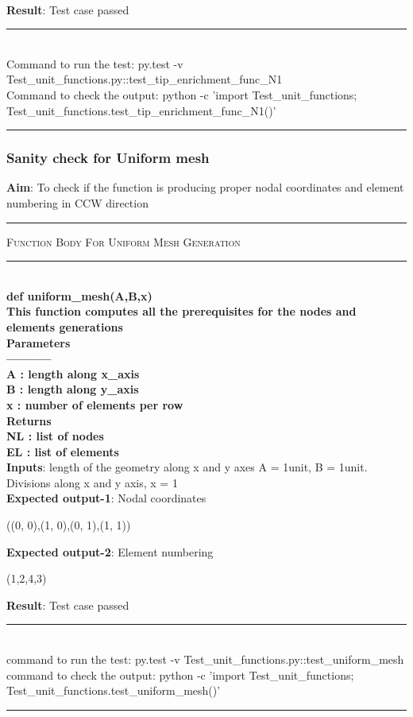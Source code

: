 \documentclass[fleqn, 12.5pt,a4paper]{report}
\begin{document}
\\
\textbf{Result}: Test case passed\\
\newline
{\rule{\linewidth}{0.02cm}}\\
Command to run the test: {\selectfont py.test -v Test{\_}unit{\_}functions.py::test{\_}tip{\_}enrichment{\_}func{\_}N1}\\
Command to check the output: {\selectfont python -c 'import Test{\_}unit{\_}functions;\\
Test{\_}unit{\_}functions.test{\_}tip{\_}enrichment{\_}func{\_}N1()'}\\
{\rule{\linewidth}{0.02cm}}

\subsubsection{Sanity check for Uniform mesh}
\textbf{Aim}: To check if the function is producing proper nodal coordinates and element numbering in CCW direction\newline
{ \rule{\linewidth}{0.05cm}}
	{\scshape Function Body For Uniform Mesh Generation}\\
{ \rule{\linewidth}{0.05cm}}
{\selectfont
\\
\textbf{def uniform{\_}mesh(A,B,x)\\
    This function computes all the prerequisites for the nodes and elements generations\\
    Parameters\\
    -----------\\
    A : length along x{\_}axis\\
    B : length along y{\_}axis\\
    x : number of elements per row\\
    Returns\\
    NL : list of nodes\\
    EL : list of elements\\
    }}
\textbf{Inputs}: length of the geometry along x and y axes A = 1unit, B = 1unit.\\
Divisions along x and y axis, x = 1\\
\textbf{Expected output-1}: Nodal coordinates
\begin{center}
((0, 0),(1, 0),(0, 1),(1, 1))
\end{center}
\textbf{Expected output-2}: Element numbering
\begin{center}
(1,2,4,3)
\end{center}
\textbf{Result}: Test case passed
\\
{\rule{\linewidth}{0.02cm}}\\
command to run the test: {\selectfont py.test -v Test{\_}unit{\_}functions.py::test{\_}uniform{\_}mesh}\\
command to check the output: {\selectfont python -c  'import Test{\_}unit{\_}functions; \\
Test{\_}unit{\_}functions.test{\_}uniform{\_}mesh()'}\\
{\rule{\linewidth}{0.02cm}}
\end{document}
